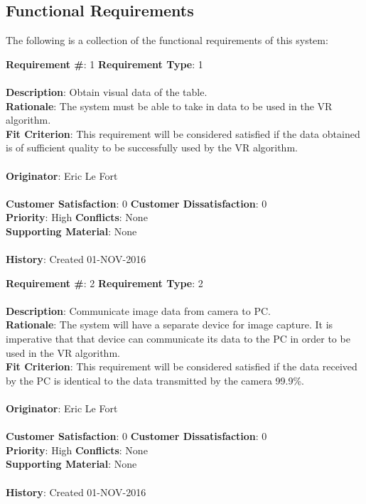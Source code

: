 \documentclass[titlepage]{article}
\begin{document}
\subsection{Functional Requirements}
The following is a collection of the functional requirements of this system:
\begin{framed}
	\noindent\textbf{Requirement \#}: 1 \hfill \textbf{Requirement Type}: 1 \hfill\\\\
	\noindent\textbf{Description}: Obtain visual data of the table.\\
	\textbf{Rationale}: The system must be able to take in data to be used in the VR algorithm.\\
	\textbf{Fit Criterion}: This requirement will be considered satisfied if the data obtained is of sufficient quality to be successfully used by the VR algorithm.\\\\
	\textbf{Originator}: Eric Le Fort\\\\
	\noindent\textbf{Customer Satisfaction}: 0 \hfill 	\textbf{Customer Dissatisfaction}: 0 \hfill\\
	\textbf{Priority}: High \hfill \textbf{Conflicts}: None \hfill 		\\
	\textbf{Supporting Material}: None\\\\
	\noindent\textbf{History}: Created 01-NOV-2016
\end{framed}

\newpage
\begin{framed}
	\noindent\textbf{Requirement \#}: 2 \hfill \textbf{Requirement Type}: 2 \hfill\\\\
	\noindent\textbf{Description}: Communicate image data from camera to PC.\\
	\textbf{Rationale}: The system will have a separate device for image capture. It is imperative that that device can communicate its data to the PC in order to be used in the VR algorithm.\\
	\textbf{Fit Criterion}: This requirement will be considered satisfied if the data received by the PC is identical to the data transmitted by the camera 99.9\%.\\\\
	\textbf{Originator}: Eric Le Fort\\\\
	\noindent\textbf{Customer Satisfaction}: 0 \hfill 	\textbf{Customer Dissatisfaction}: 0 \hfill\\
	\textbf{Priority}: High \hfill \textbf{Conflicts}: None \hfill\\
	\textbf{Supporting Material}: None\\\\
	\noindent\textbf{History}: Created 01-NOV-2016
\end{framed}
\end{document}
